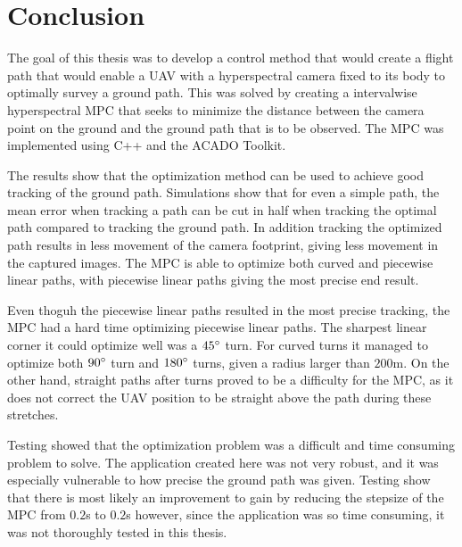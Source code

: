 \chapter{Conclusion}

The goal of this thesis was to develop a control method that would create a flight path that would enable a UAV with a hyperspectral camera fixed to its body to optimally survey a ground path. This was solved by creating a intervalwise hyperspectral MPC that seeks to minimize the distance between the camera point on the ground and the ground path that is to be observed. The MPC was implemented using C++ and the ACADO Toolkit.

The results show that the optimization method can be used to achieve good tracking of the ground path. Simulations show that for even a simple path, the mean error when tracking a path can be cut in half when tracking the optimal path compared to tracking the ground path. In addition tracking the optimized path results in less movement of the camera footprint, giving less movement in the captured images. The MPC is able to optimize both curved and piecewise linear paths, with piecewise linear paths giving the most precise end result.

Even thoguh the piecewise linear paths resulted in the most precise tracking, the MPC had a hard time optimizing piecewise linear paths. The sharpest linear corner it could optimize well was a $45\degree$ turn. For curved turns it managed to optimize both $90\degree$ turn and $180\degree$ turns, given a radius larger than $200$m. On the other hand, straight paths after turns proved to be a difficulty for the MPC, as it does not correct the UAV position to be straight above the path during these stretches.

Testing showed that the optimization problem was a difficult and time consuming problem to solve. The application created here was not very robust, and it was especially vulnerable to how precise the ground path was given. Testing show that there is most likely an improvement to gain by reducing the stepsize of the MPC from $0.2$s to $0.2$s however, since the application was so time consuming, it was not thoroughly tested in this thesis.



